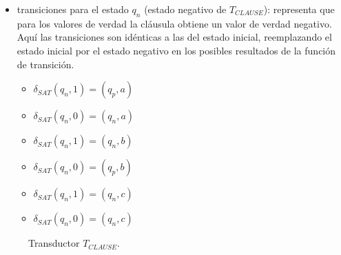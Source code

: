 \documentclass[12pt]{article}
\begin{document}
\begin{itemize}
    \item  transiciones para el estado $q_n$ (estado negativo de $T_{CLAUSE}$): representa que para los valores de verdad la cláusula obtiene un valor de verdad negativo.
          Aquí las transiciones son idénticas a las del estado inicial, reemplazando el estado inicial por el estado negativo en los posibles resultados
          de la función de transición.       
          
          \begin{multicols}{2}
              \begin{itemize}
                  \item $\delta_{SAT}(q_{n},1)=(q_{p},a)$
                  \item $\delta_{SAT}(q_{n},0)=(q_{n},a)$
                  \item $\delta_{SAT}(q_{n},1)=(q_{n},b)$
                  \item $\delta_{SAT}(q_{n},0)=(q_{p},b)$
                  \item $\delta_{SAT}(q_{n},1)=(q_{n},c)$
                  \item $\delta_{SAT}(q_{n},0)=(q_{n},c)$
              \end{itemize}
          \end{multicols}
\end{itemize}

\begin{figure}[h]
    \centering {}
    \caption{Transductor $T_{CLAUSE}$.}
    \label{fig:transducer} %
\end{figure}
\end{document}
